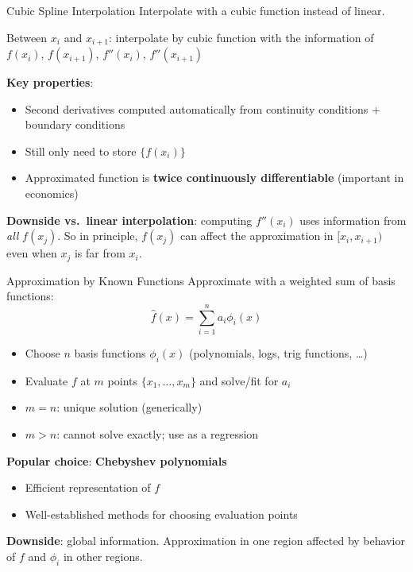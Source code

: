 \documentclass[blue]{beamer}
\begin{document}
\begin{frame}{Cubic Spline Interpolation}
	Interpolate with a cubic function instead of linear.
	

	Between $x_i$ and $x_{i+1}$: interpolate by cubic function with the information of $f(x_i)$, $f(x_{i+1})$, $f''(x_i)$, $f''(x_{i+1})$ 
	
	\bigskip
	\textbf{Key properties}:

	\begin{itemize}
		\item Second derivatives computed automatically from continuity conditions + boundary conditions
		\item Still only need to store $\{f(x_i)\}$
		\item Approximated function is \textbf{twice continuously differentiable} (important in economics)
	\end{itemize}
	
	\bigskip
	\textbf{Downside vs.\ linear interpolation}: computing $f''(x_i)$ uses information from \emph{all} $f(x_j)$. So in principle, $f(x_j)$ can affect the approximation in $[x_i, x_{i+1})$ even when $x_j$ is far from $x_i$.
\end{frame}

\begin{frame}{Approximation by Known Functions}
	Approximate with a weighted sum of basis functions:
	\[
	\hat{f}(x) = \sum_{i=1}^n a_i \phi_i(x)
	\]
	\vspace{-15pt}
	\begin{itemize}
		\item Choose $n$ basis functions $\phi_i(x)$ (polynomials, logs, trig functions, \ldots)
		\item Evaluate $f$ at $m$ points $\{x_1, \ldots, x_m\}$ and solve/fit for $a_i$
		\item $m = n$: unique solution (generically)
		\item $m > n$: cannot solve exactly; use as a regression
	\end{itemize}
	
	\textbf{Popular choice}: \textbf{Chebyshev polynomials}
	\vspace{-5pt}
	\begin{itemize}
		\item Efficient representation of $f$
		\item Well-established methods for choosing evaluation points
	\end{itemize}
	\textbf{Downside}: global information. Approximation in one region affected by behavior of $f$ and $\phi_i$ in other regions.
\end{frame}
\end{document}

